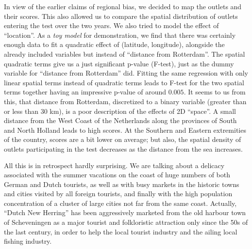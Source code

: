 \documentclass[alpha-refs]{wiley-article}
\newcommand{\fn}[1]{\textcolor{purple}{#1}}
\begin{document}


In view of the earlier claims of regional bias, we decided to map the outlets and their scores.  This also allowed us to compare the spatial distribution of outlets entering the test over the two years. We also tried to model the effect of ``location''.  As a \emph{toy model} for demonstration, we find that there was certainly enough data to fit a quadratic effect of (latitude, longitude), alongside the already included variables but instead of ``distance from Rotterdam''.  The spatial quadratic terms give us a just significant p-value (F-test), just as the dummy variable for ``distance from Rotterdam'' did.  Fitting the same regression with only linear spatial terms instead of quadratic terms leads to F-test for the two spatial terms together having an impressive p-value of around $0.005$.  It seems to us from this, that distance from Rotterdam, discretized to a binary variable (greater than or less than 30 km), is a poor description of the effects of 2D ``space''. A small distance from the West Coast of the Netherlands along the provinces of South and North Holland leads to high scores. At the Southern and Eastern extremities of the country, scores are a bit lower on average; but also, the spatial density of outlets participating in the test decreases as the distance from the sea increases.

All this is in retrospect hardly surprising. We are talking about a delicacy associated with the summer vacations on the coast of huge numbers of both German and Dutch tourists, as well as with busy markets in the historic towns and cities visited by all foreign tourists, and finally with the high population concentration of a cluster of large cities not far from the same coast. Actually, ``Dutch New Herring'' has been aggressively marketed from the old harbour town of Scheveningen as a major tourist and folkloristic attraction only since the 50s of the last century, in order to help the local tourist industry and the ailing local fishing industry.
\end{document}
